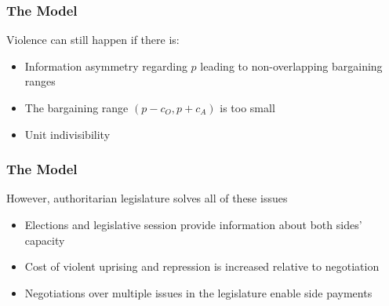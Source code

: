 \documentclass{beamer}
\begin{document}
\begin{frame}
\frametitle{The Model}
\centering
Violence can still happen if there is:
\begin{itemize}
\item Information asymmetry regarding $p$ leading to non-overlapping bargaining ranges
\item<2-> The bargaining range $(p - c_O, p + c_A)$ is too small
\item<3-> Unit indivisibility
\end{itemize}
\end{frame}

\begin{frame}
\frametitle{The Model}
However, authoritarian legislature solves all of these issues
\begin{itemize}
\item Elections and legislative session provide information about both sides' capacity
\item Cost of violent uprising and repression is increased relative to negotiation
\item Negotiations over multiple issues in the legislature enable side payments
\end{itemize}
\end{frame}
\end{document}
